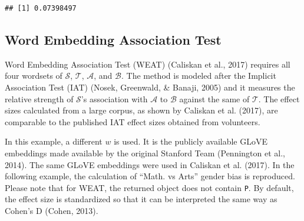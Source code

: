 \documentclass[english,man,mask]{apa6}
\begin{document}
\begin{verbatim}
## [1] 0.07398497
\end{verbatim}

\hypertarget{word-embedding-association-test}{%
\subsection{Word Embedding Association Test}\label{word-embedding-association-test}}

Word Embedding Association Test (WEAT) (Caliskan et al., 2017) requires all four wordsets of \(\mathcal{S}\), \(\mathcal{T}\), \(\mathcal{A}\), and \(\mathcal{B}\). The method is modeled after the Implicit Association Test (IAT) (Nosek, Greenwald, \& Banaji, 2005) and it measures the relative strength of \(\mathcal{S}\)'s association with \(\mathcal{A}\) to \(\mathcal{B}\) against the same of \(\mathcal{T}\). The effect sizes calculated from a large corpus, as shown by Caliskan et al. (2017), are comparable to the published IAT effect sizes obtained from volunteers.

In this example, a different \(w\) is used. It is the publicly available GLoVE embeddings made available by the original Stanford Team (Pennington et al., 2014). The same GLoVE embeddings were used in Caliskan et al. (2017). In the following example, the calculation of \enquote{Math. vs Arts} gender bias is reproduced. Please note that for WEAT, the returned object does not contain \texttt{P}. By default, the effect size is standardized so that it can be interpreted the same way as Cohen's D (Cohen, 2013).
\end{document}
